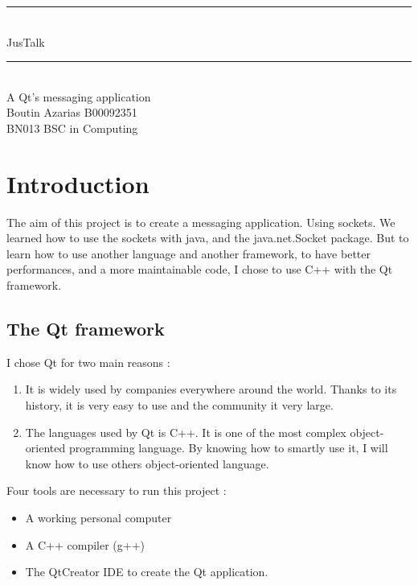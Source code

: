 \documentclass[12pt]{report}
\newcommand{\Mline}{\hrule \mbox{}\\[0.1cm]}
\begin{document}
\begin{titlepage}
\begin{center}


\Mline
{ \LARGE JusTalk \\[0.4cm] }
\Mline

\textsf{A Qt's messaging application}\\[3cm]

\textsf{Boutin Azarias B00092351\\[2cm]
	BN013 BSC in Computing}

\end{center}
\end{titlepage}

\setcounter{page}{2}

\tableofcontents


\chapter{Introduction}
The aim of this project is to create a messaging application. Using sockets. We learned how to use the sockets with java, and the java.net.Socket package. But to learn how to use another language and another framework, to have better performances, and a more maintainable code, I chose to use C++ with the Qt framework.

\section{The Qt framework}
I chose Qt for two main reasons : 
\begin{enumerate}
	\item It is widely used by companies everywhere around the world. Thanks to its history, it is very easy to use and the community it very large.
	\item The languages used by Qt is C++. It is one of the most complex object-oriented programming language. By knowing how to smartly use it, I will know how to use others object-oriented language.
\end{enumerate}

Four tools are necessary to run this project :
\begin{itemize}
	\item A working personal computer
	\item A C++ compiler (g++)
	\item The QtCreator IDE to create the Qt application.
\end{itemize}
\end{document}
